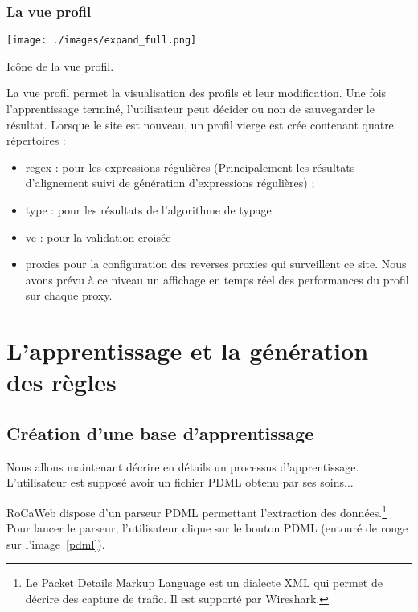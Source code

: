 \documentclass[a4paper,10pt,justified]{book}
\begin{document}
\subsection{La vue profil}
\begin{marginfigure}
 \texttt{[image: ./images/expand\_full.png]}
 \label{iconevuesites}
\caption{Icône de la vue profil.}
 \end{marginfigure}
 
La vue profil permet la visualisation des profils et leur modification. Une fois l'apprentissage terminé, l'utilisateur peut décider ou non de sauvegarder le résultat. 
Lorsque le site est nouveau, un profil vierge est crée contenant quatre répertoires : 
\begin{itemize}
 \item regex : pour les expressions régulières (Principalement les résultats d'alignement suivi de génération d'expressions régulières) ;
 \item type : pour les résultats de l'algorithme de typage
 \item vc : pour la validation croisée
 \item proxies pour la configuration des reverses proxies qui surveillent ce site. Nous avons prévu à ce niveau un affichage en temps réel des performances  du profil sur chaque proxy.  
\end{itemize}



\chapter{L'apprentissage et la génération des règles}


\section{Création d'une base d'apprentissage}



Nous allons maintenant décrire en détails un processus d'apprentissage. L'utilisateur est supposé avoir un fichier PDML obtenu par ses soins...

RoCaWeb dispose d'un parseur PDML permettant l'extraction des données.\footnote{Le Packet Details Markup Language est un dialecte XML qui permet de décrire des capture de trafic. Il est supporté par Wireshark.} 
Pour lancer le parseur, l'utilisateur clique sur le bouton PDML (entouré de rouge sur l'image~\ref{pdml}).
\end{document}
